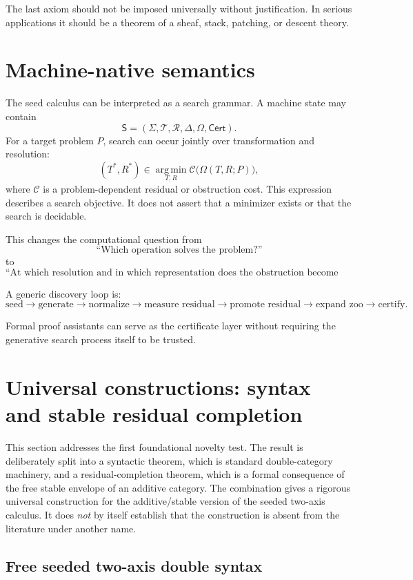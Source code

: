 \documentclass[11pt]{article}
\theoremstyle{definition}
\theoremstyle{remark}
\newcommand{\Seeds}{\Sigma}
\begin{document}
The last axiom should not be imposed universally without justification. In serious applications it should be a theorem of a sheaf, stack, patching, or descent theory.

\section{Machine-native semantics}

The seed calculus can be interpreted as a search grammar. A machine state may contain
\[
\mathsf S=
(\Seeds,\mathscr T,\mathscr R,\Delta,\Omega,\mathsf{Cert}).
\]
For a target problem $P$, search can occur jointly over transformation and resolution:
\[
(T^\ast,R^\ast)
\in
\operatorname*{arg\,min}_{T,R}
\mathcal C\bigl(\Omega(T,R;P)\bigr),
\]
where $\mathcal C$ is a problem-dependent residual or obstruction cost. This expression describes a search objective. It does not assert that a minimizer exists or that the search is decidable.

This changes the computational question from
\[
\text{``Which operation solves the problem?''}
\]
to
\[
\boxed{
\text{``At which resolution and in which representation does the obstruction become simplest?''}
}
\]

A generic discovery loop is:
\[
\boxed{
\text{seed}
\to
\text{generate}
\to
\text{normalize}
\to
\text{measure residual}
\to
\text{promote residual}
\to
\text{expand zoo}
\to
\text{certify}.
}
\]

Formal proof assistants can serve as the certificate layer without requiring the generative search process itself to be trusted.


\section{Universal constructions: syntax and stable residual completion}\label{sec:universal}

This section addresses the first foundational novelty test. The result is deliberately split into a syntactic theorem, which is standard double-category machinery, and a residual-completion theorem, which is a formal consequence of the free stable envelope of an additive category. The combination gives a rigorous universal construction for the additive/stable version of the seeded two-axis calculus. It does \emph{not} by itself establish that the construction is absent from the literature under another name.

\subsection{Free seeded two-axis double syntax}
\end{document}
